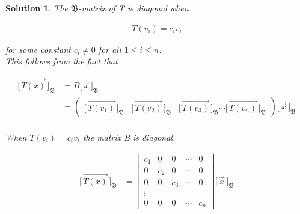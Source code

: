 \documentclass{article}
\newtheorem*{solution}{Solution}
\newcommand{\Coord}[2]{\Bigg[ \, \vec{#1} \, \Bigg]_{\mathfrak{#2}}}
\begin{document}
\begin{solution}
The $\mathfrak{B}$-matrix of T is diagonal when 

\begin{align*}
T(v_{i}) = c_{i}v_{i} 
\end{align*} 

for some constant $c_{i} \neq 0$ for all $1 \leq i \leq n$. \\

This follows from the fact that

\begin{align*}
\Coord{T(x)}{B} &= B \Coord{x}{B} \\
&= \begin{pmatrix} \Coord{T(v_{1})}{B} & \Coord{T(v_{2})}{B} & \Coord{T(v_{3})}{B} \cdots \Coord{T(v_{n})}{B} \end{pmatrix} \Coord{x}{B} \\
\end{align*}

When $T(v_{i}) = c_{i}v_{i}$ the matrix B is diagonal. 

\begin{align*}
\Coord{T(x)}{B} &=
\begin{bmatrix}
c_{1} & 0 & 0 & \cdots & 0 \\
0 & c_{2} & 0 & \cdots & 0 \\
0 & 0 & c_{3} & \cdots & 0 \\
\vdots \\
0 & 0 & 0 & \cdots & c_{n}
\end{bmatrix} \Coord{x}{B} 
\end{align*}

\end{solution}
\end{document}
